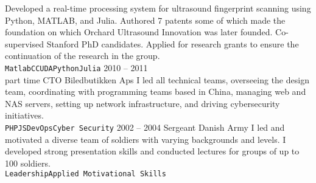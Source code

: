 \documentclass[8pt]{mofiicv}
\begin{document}
\begin{minipage}[T]{\SecondColumnWidth}
\begin{entrylist}
{		Developed a real-time processing system for ultrasound fingerprint scanning using Python, MATLAB, and Julia.
		Authored 7 patents some of which made the foundation on which Orchard Ultrasound Innovation was later founded. 
		Co-supervised Stanford PhD candidates. Applied for research grants to ensure the continuation of the research in the group.\\ 
		\texttt{Matlab}\slashsep\texttt{C}\slashsep\texttt{CUDA}\slashsep\texttt{Python}\slashsep\texttt{Julia}
		}
	\entry
		{2010 -- 2011\\\footnotesize{part time}}
		{CTO}
		{Biledbutikken Aps}
		{
		I led all technical teams, overseeing the design team, coordinating with programming teams based in China, managing web and NAS servers, setting up network infrastructure, and driving cybersecurity initiatives.\\
		\texttt{PHP}\slashsep\texttt{JS}\slashsep\texttt{DevOps}\slashsep\texttt{Cyber Security}
		}
	\entry
		{2002 -- 2004}
		{Sergeant}
		{Danish Army}
		{
		I led and motivated a diverse team of soldiers with varying backgrounds and levels. I developed strong presentation skills and conducted lectures for groups of up to 100 soldiers.\\ 
		\texttt{Leadership}\slashsep\texttt{Applied Motivational Skills}
		}
\end{entrylist}


\end{minipage}
\end{document}
